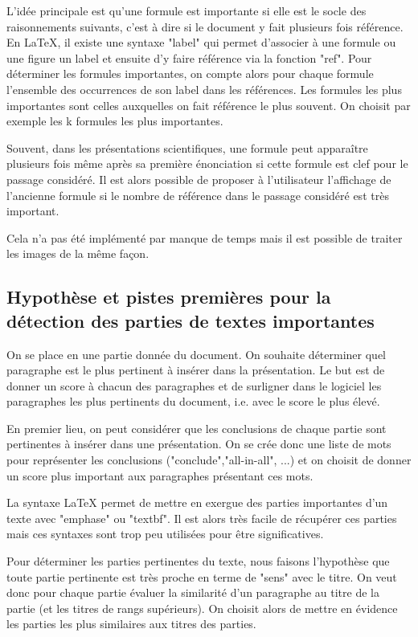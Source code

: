 \documentclass[12pt]{article}
\begin{document}
\noindent
L'idée principale est qu'une formule est importante si elle est le socle des raisonnements suivants, c'est à dire si le document y fait plusieurs fois référence. En LaTeX, il existe une syntaxe "label{}" qui permet d'associer à une formule ou une figure un label et ensuite d'y faire référence via la fonction "ref{}". Pour déterminer les formules importantes, on compte alors pour chaque formule l'ensemble des occurrences de son label dans les références. Les formules les plus importantes sont celles auxquelles on fait référence le plus souvent. On choisit par exemple les k formules les plus importantes.

\noindent
Souvent, dans les présentations scientifiques, une formule peut apparaître plusieurs fois même après sa première énonciation si cette formule est clef pour le passage considéré. Il est alors possible de proposer à l'utilisateur l'affichage de l'ancienne formule si le nombre de référence dans le passage considéré est très important.

\noindent
Cela n'a pas été implémenté par manque de temps mais il est possible de traiter les images de la même façon.

\subsection{Hypothèse et pistes premières pour la détection des parties de textes importantes}
\noindent
On se place en une partie donnée du document. On souhaite déterminer quel paragraphe est le plus pertinent à insérer dans la présentation. Le but est de donner un score à chacun des paragraphes et de surligner dans le logiciel les paragraphes les plus pertinents du document, i.e. avec le score le plus élevé.

\noindent
En premier lieu, on peut considérer que les conclusions de chaque partie sont pertinentes à insérer dans une présentation. On se crée donc une liste de mots pour représenter les conclusions ("conclude","all-in-all", ...) et on choisit de donner un score plus important aux paragraphes présentant ces mots.

\noindent
La syntaxe LaTeX permet de mettre en exergue des parties importantes d'un texte avec "emphase" ou "textbf". Il est alors très facile de récupérer ces parties mais ces syntaxes sont trop peu utilisées pour être significatives. 

\noindent
Pour déterminer les parties pertinentes du texte, nous faisons l'hypothèse que toute partie pertinente est très proche en terme de "sens" avec le titre. On veut donc pour chaque partie évaluer la similarité d'un paragraphe au titre de la partie (et les titres de rangs supérieurs). On choisit alors de mettre en évidence les parties les plus similaires aux titres des parties.
\end{document}
